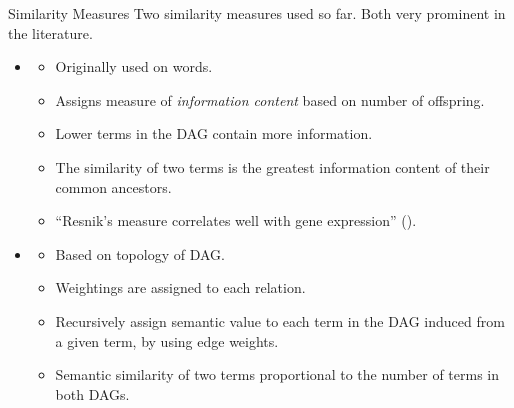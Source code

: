\documentclass{beamer}
\begin{document}
	\begin{frame}{Similarity Measures}
		Two similarity measures used so far. Both very prominent in the literature.
		
		\begin{itemize}
			\item \cite{resnik1999semantic}
			\begin{itemize}
				\item Originally used on words.
				\item Assigns measure of \textit{information content} based on number of offspring.
				\item Lower terms in the DAG contain more information.
				\item The similarity of two terms is the greatest information content of their common ancestors.
				\item ``Resnik's measure correlates well with gene expression'' (\cite{sevilla2005correlation}).
			\end{itemize}
			\item \cite{wang2007new}
			\begin{itemize}
				\item Based on topology of DAG.
				\item Weightings are assigned to each relation.
				\item Recursively assign semantic value to each term in the DAG induced from a given term, by using edge weights.
				\item Semantic similarity of two terms proportional to the number of terms in both DAGs.
			\end{itemize}
		\end{itemize}

	\end{frame}
	
\end{document}
